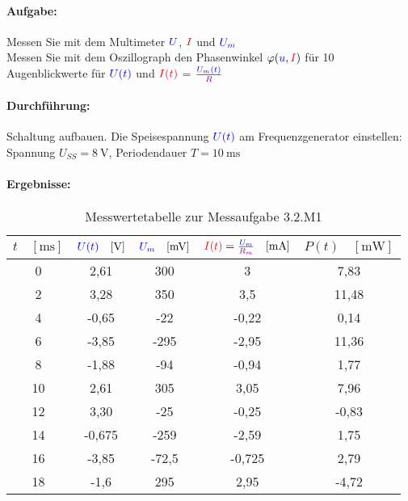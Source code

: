 \documentclass[a4paper,titlepage,parskip]{scrreprt}
\newcommand{\spannung}[1]{\textcolor{blue}{#1}}
\newcommand{\strom}[1]{\textcolor{red}{#1}}
\newcommand{\widerstand}[1]{\textcolor{violet}{#1}}
\begin{document}
                    \paragraph{Aufgabe:} Messen Sie mit dem Multimeter $\spannung{U}$, $\strom{I}$ und $\spannung{U_m}$\\
                     Messen Sie mit dem Oszillograph den Phasenwinkel $\varphi(\spannung{u},\strom{I})$ für 10 Augenblickwerte für $\spannung{U(t)}$ und $\strom{I(t)}$ = $\frac{\spannung{U_m(t)}}{\widerstand{R}}$
                    \paragraph{Durchführung:} Schaltung aufbauen. Die Speisespannung $\spannung{U(t)}$ am Frequenzgenerator einstellen: Spannung $U_{SS} = \SI{8}{\volt}$, Periodendauer  $T = \SI{10}{\milli\second}$ 
					\pagebreak                    
                    \paragraph{Ergebnisse:}
                        \begin{center}
                            \begin{table}[!hbtp]
                                \caption{Messwertetabelle zur Messaufgabe 3.2.M1}
                                \label{tbl:messergebnisse3.1}
                                \renewcommand{\arraystretch}{1.3}
                                \begin{center}
                                    \begin{tabular}{c|cccc}
  										 $t \quad [\si{\milli\second}]$ & $\spannung{U(t)}\quad  [\si{\volt}]$ & $\spannung{U_m} \quad [\si{\milli\volt}]$ & $\strom{I(t)} = \frac{\spannung{U_m}}{\widerstand{R_m}}  \quad[\si{\milli\ampere}]$ & $P(t) \quad [\si{\milli\watt}]$\\ \hline
   										0 & 2,61 & 300 & 3  & 7,83\\
   										2 & 3,28 & 350 & 3,5 & 11,48\\
   										4 & -0,65 & -22 & -0,22& 0,14\\
   										6 & -3,85 & -295 & -2,95 & 11,36\\
  										8 & -1,88 & -94 & -0,94 & 1,77\\
   										10 & 2,61 & 305 & 3,05 & 7,96\\
   										12 & 3,30 & -25 & -0,25 & -0,83\\
   										14 & -0,675 & -259 & -2,59 & 1,75\\
   										16 & -3,85 & -72,5 & -0,725 & 2,79\\
   										18 & -1,6 & 295 & 2,95 & -4,72\\
									\end{tabular}
                                \end{center}
                            \end{table}
                        \end{center}
                    
\end{document}
